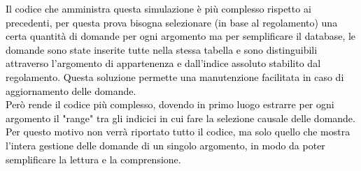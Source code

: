 \textcolor{black}{Il codice che amministra questa simulazione è più complesso rispetto ai precedenti, per questa prova bisogna selezionare (in base al regolamento) una certa quantità di domande per ogni argomento ma per semplificare il database, le domande sono state inserite tutte nella stessa tabella e sono distinguibili attraverso l'argomento di appartenenza e dall'indice assoluto stabilito dal regolamento. Questa soluzione permette una manutenzione facilitata in caso di aggiornamento delle domande.\\
Però rende il codice più complesso, dovendo in primo luogo estrarre per ogni argomento il "range" tra gli indicici in cui fare la selezione causale delle domande.\\
Per questo motivo non verrà riportato tutto il codice, ma solo quello che mostra l'intera gestione delle domande di un singolo argomento, in modo da poter semplificare la lettura e la comprensione.}\\

